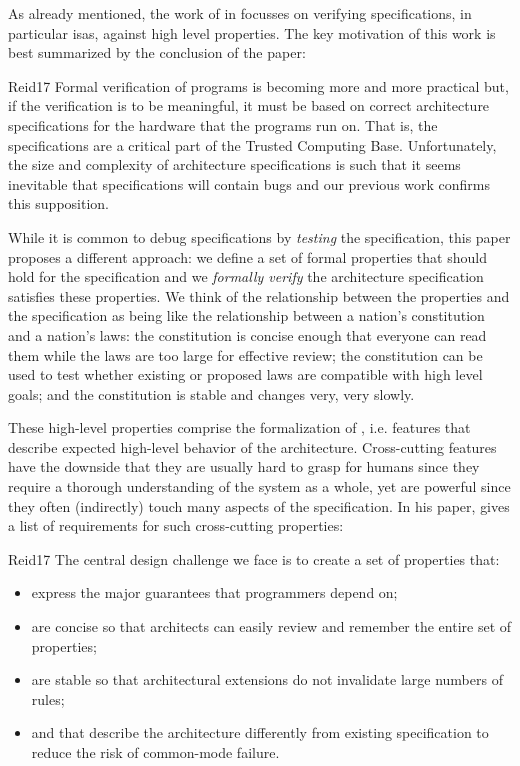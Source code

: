 As already mentioned, the work of \citeauthor{Reid17} in  \cite{Reid17} focusses on verifying specifications, in particular \glspl{isa}, against high level properties.
The key motivation of this work is best summarized by the conclusion of the paper:
\begin{displaycquote}[p.88:22]{Reid17}
    Formal verification of programs is becoming more and more practical but, if the verification is to be meaningful, it must be based on correct architecture specifications for the hardware that the programs run on.
    That is, the specifications are a critical part of the Trusted Computing Base.
    Unfortunately, the size and complexity of architecture specifications is such that it seems inevitable that specifications will contain bugs and our previous work confirms this supposition.

    While it is common to debug specifications by \textit{testing} the specification, this paper proposes a different approach:
    we define a set of formal properties that should hold for the specification and we \textit{formally verify} the architecture specification satisfies these properties.
    We think of the relationship between the properties and the specification as being like the relationship between a nation's constitution and a nation's laws:
    the constitution is concise enough that everyone can read them while the laws are too large for effective review; the constitution can be used to test whether existing or proposed laws are compatible with high level goals; and the constitution is stable and changes very, very slowly.
\end{displaycquote}

These high-level properties comprise the formalization of , i.e. features that describe expected high-level behavior of the architecture.
Cross-cutting features have the downside that they are usually hard to grasp for humans since they require a thorough understanding of the system as a whole, yet are powerful since they often (indirectly) touch many aspects of the specification.
In his paper, \citeauthor{Reid17} gives a list of requirements for such cross-cutting properties:
\begin{displaycquote}[pp.88:2-3]{Reid17}
    The central design challenge we face is to create a set of properties that:
    \begin{itemize}
        \item express the major guarantees that programmers depend on;
        \item are concise so that architects can easily review and remember the entire set of properties;
        \item are stable so that architectural extensions do not invalidate large numbers of rules;
        \item and that describe the architecture differently from existing specification to reduce the risk of common-mode failure.
    \end{itemize}
\end{displaycquote}

